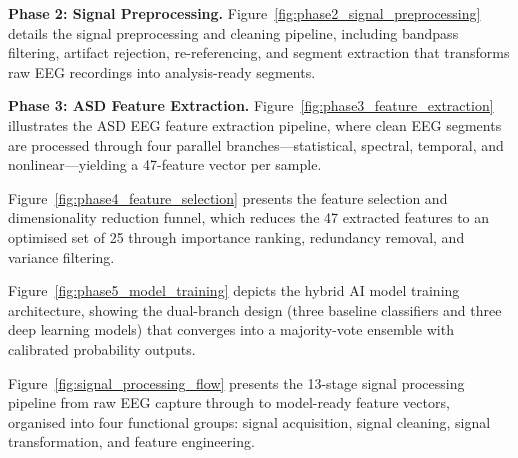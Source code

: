 


\noindent\textbf{Phase 2: Signal Preprocessing.} Figure~\ref{fig:phase2_signal_preprocessing} details the signal preprocessing and cleaning pipeline, including bandpass filtering, artifact rejection, re-referencing, and segment extraction that transforms raw EEG recordings into analysis-ready segments.




\noindent\textbf{Phase 3: ASD Feature Extraction.} Figure~\ref{fig:phase3_feature_extraction} illustrates the ASD EEG feature extraction pipeline, where clean EEG segments are processed through four parallel branches---statistical, spectral, temporal, and nonlinear---yielding a 47-feature vector per sample.




Figure~\ref{fig:phase4_feature_selection} presents the feature selection and dimensionality reduction funnel, which reduces the 47 extracted features to an optimised set of 25 through importance ranking, redundancy removal, and variance filtering.




Figure~\ref{fig:phase5_model_training} depicts the hybrid AI model training architecture, showing the dual-branch design (three baseline classifiers and three deep learning models) that converges into a majority-vote ensemble with calibrated probability outputs.





Figure~\ref{fig:signal_processing_flow} presents the 13-stage signal processing pipeline from raw EEG capture through to model-ready feature vectors, organised into four functional groups: signal acquisition, signal cleaning, signal transformation, and feature engineering.



